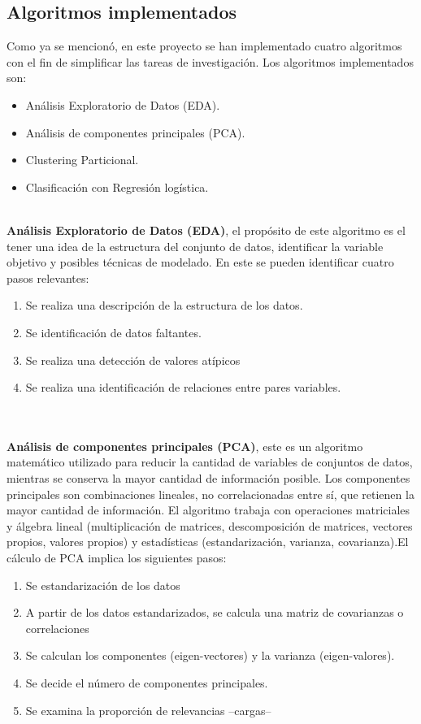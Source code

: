 \documentclass[10pt,a4paper]{article}
\begin{document}
  \subsection*{Algoritmos implementados}
  Como ya se mencionó, en este proyecto se han implementado cuatro algoritmos con el fin de simplificar las tareas de investigación. Los algoritmos implementados son:
  \begin{itemize}
      \item Análisis Exploratorio de Datos (EDA).
      \item Análisis de componentes principales (PCA).
      \item Clustering Particional.
      \item Clasificación con Regresión logística. 
  \end{itemize}\\
  \textbf{Análisis Exploratorio de Datos (EDA)}, el propósito de este algoritmo es el tener una idea de la estructura del conjunto de datos, identificar la variable objetivo y posibles técnicas de modelado. En este se pueden identificar cuatro pasos relevantes:
  \begin{enumerate}
      \item Se realiza una descripción de la estructura de los datos.
      \item Se identificación de datos faltantes.
      \item Se realiza una detección de valores atípicos
      \item Se realiza una identificación de relaciones entre pares variables.
  \end{enumerate}
  \\ \\
  \textbf{Análisis de componentes principales (PCA)}, este es un algoritmo matemático utilizado para reducir la cantidad de variables de conjuntos de datos, mientras se conserva la mayor cantidad de información posible. Los componentes principales son combinaciones lineales, no correlacionadas entre sí, que retienen la mayor cantidad de información. El algoritmo trabaja con operaciones matriciales y álgebra lineal (multiplicación de matrices, descomposición de matrices, vectores propios, valores propios) y estadísticas (estandarización, varianza, covarianza).El cálculo de PCA implica los siguientes pasos: 
  \begin{enumerate}
      \item Se estandarización de los datos
      \item A partir de los datos estandarizados, se calcula una matriz de covarianzas o correlaciones
      \item Se calculan los componentes (eigen-vectores) y la varianza (eigen-valores).
      \item Se decide el número de componentes principales.
      \item Se examina la proporción de relevancias –cargas–
  \end{enumerate}
\end{document}
